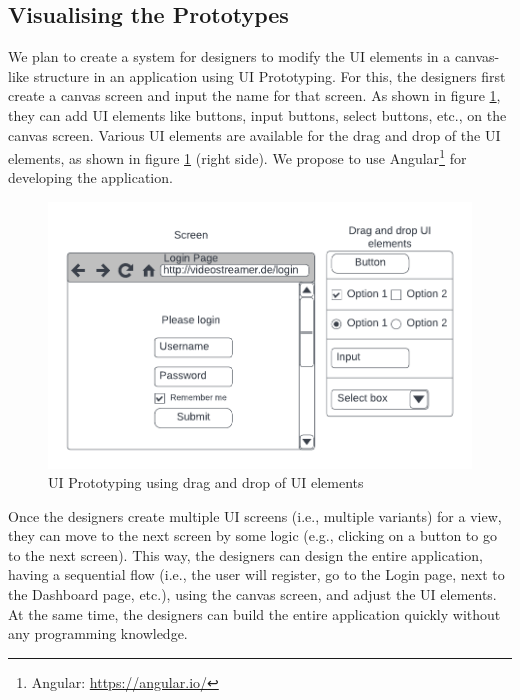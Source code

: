 \subsection{Visualising the Prototypes}
\label{solutionideas:subsection:visualize}

We plan to create a system for designers to modify the UI elements in a canvas-like structure in an application using UI Prototyping.
For this, the designers first create a canvas screen and input the name for that screen.
As shown in figure \ref{solutionideas:fig:uiprototyping}, they can add UI elements like buttons, input buttons, select buttons, etc., on the canvas screen.
Various UI elements are available for the drag and drop of the UI elements, as shown in figure \ref{solutionideas:fig:uiprototyping} (right side).
We propose to use Angular\footnote{Angular: \url{https://angular.io/}} for developing the application.

\begin{figure}[h]
    \centering
    \includegraphics[scale=0.4]{images/solution-ideas/UIPrototyping.png}
    \caption{UI Prototyping using drag and drop of UI elements}
    \label{solutionideas:fig:uiprototyping}
\end{figure}

Once the designers create multiple UI screens (i.e., multiple variants) for a view, they can move to the next screen by some logic (e.g., clicking on a button to go to the next screen).
This way, the designers can design the entire application, having a sequential flow (i.e., the user will register, go to the Login page, next to the Dashboard page, etc.), using the canvas screen, and adjust the UI elements.
At the same time, the designers can build the entire application quickly without any programming knowledge.

